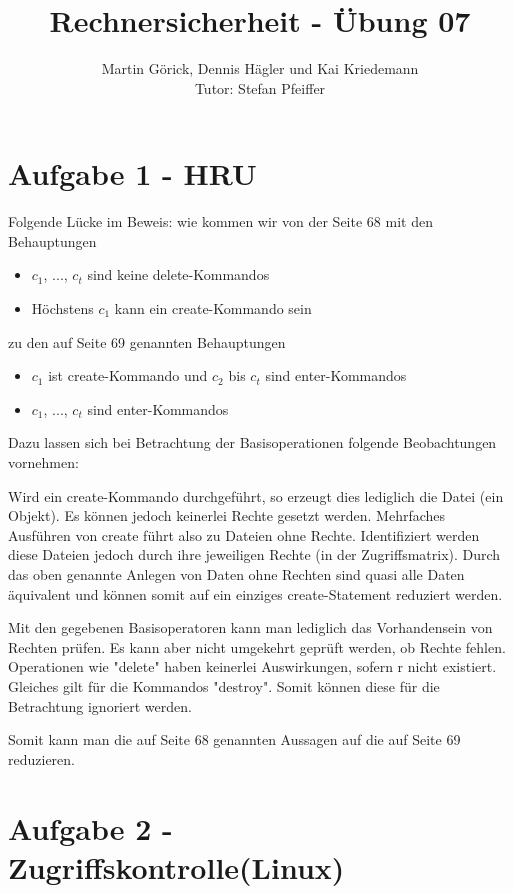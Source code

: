 \documentclass{scrartcl}
\title{Rechnersicherheit - Übung 07}
\author{Martin Görick, Dennis Hägler und Kai Kriedemann \\ Tutor: Stefan Pfeiffer}
\begin{document}
\maketitle


\section*{Aufgabe 1 - HRU}
Folgende Lücke im Beweis: wie kommen wir von der Seite 68 mit den Behauptungen
\begin{itemize}
  \item $c_{1}$, ..., $c_{t}$ sind keine delete-Kommandos
  \item Höchstens $c_{1}$ kann ein create-Kommando sein
\end{itemize}

zu den auf Seite 69 genannten Behauptungen
\begin{itemize}
  \item $c_{1}$ ist create-Kommando und $c_{2}$ bis $c_{t}$ sind enter-Kommandos
  \item $c_{1}$, ..., $c_{t}$ sind enter-Kommandos
\end{itemize}

Dazu lassen sich bei Betrachtung der Basisoperationen folgende Beobachtungen vornehmen:

Wird ein create-Kommando durchgeführt, so erzeugt dies lediglich die Datei (ein Objekt). 
Es können jedoch keinerlei Rechte gesetzt werden. Mehrfaches Ausführen von create führt also 
zu Dateien ohne Rechte. Identifiziert werden diese Dateien jedoch durch ihre jeweiligen Rechte 
(in der Zugriffsmatrix). Durch das oben genannte Anlegen von Daten ohne Rechten sind quasi 
alle Daten äquivalent und können somit auf ein einziges create-Statement reduziert werden.

Mit den gegebenen Basisoperatoren kann man lediglich das Vorhandensein von Rechten prüfen. 
Es kann aber nicht umgekehrt geprüft werden, ob Rechte fehlen. Operationen wie "delete" 
haben keinerlei Auswirkungen, sofern r nicht existiert. Gleiches gilt für die Kommandos 
"destroy". Somit können diese für die Betrachtung ignoriert werden.

Somit kann man die auf Seite 68 genannten Aussagen auf die auf Seite 69 reduzieren.


\section*{Aufgabe 2 - Zugriffskontrolle(Linux)}
\end{document}
